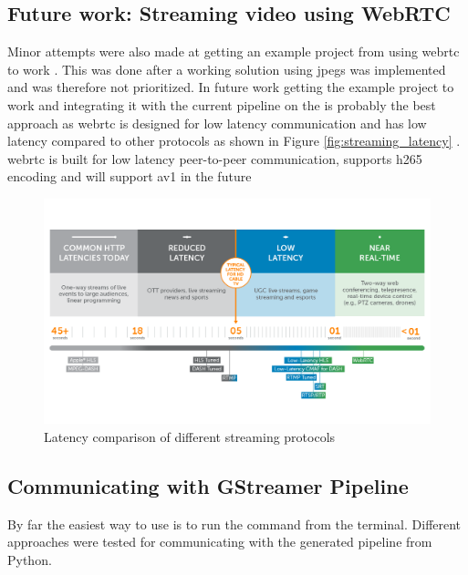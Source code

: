 \subsection{Future work: Streaming video using WebRTC}
Minor attempts were also made at getting an example project from \gs using \gls{webrtc} to work \cite{gstreamerWebrtcMasterGStreamer2021}.
This was done after a working solution using \glspl{jpeg} was implemented and was therefore not prioritized.
In future work getting the example project to work and integrating it with the current pipeline on the \sr is probably the best approach as \gls{webrtc} is designed for low latency communication and has low latency compared to other protocols as shown in Figure \ref{fig:streaming_latency} \cite{doughertyUltraLowLatency2022}.
\gls{webrtc} is built for low latency peer-to-peer communication, supports \gls{h265} encoding and will support \gls{av1} in the future \cite[1]{loretoRealTimeCommunicationWebRTC2014} \cite{mekyaFirstHEVC2652020}
\cite{red5proKeyReasonsAV12023}
\begin{figure}[H]
    \centering
    \includegraphics[width=\textwidth]{figures/webrtc_latency.png}
    \caption{Latency comparison of different streaming protocols \cite{doughertyUltraLowLatency2022}}
    \label{fig:straming_latency}
\end{figure}




\subsection{Communicating with GStreamer Pipeline}
By far the easiest way to use \gs is to run the  command from the terminal.
Different approaches were tested for communicating with the generated pipeline from Python.

